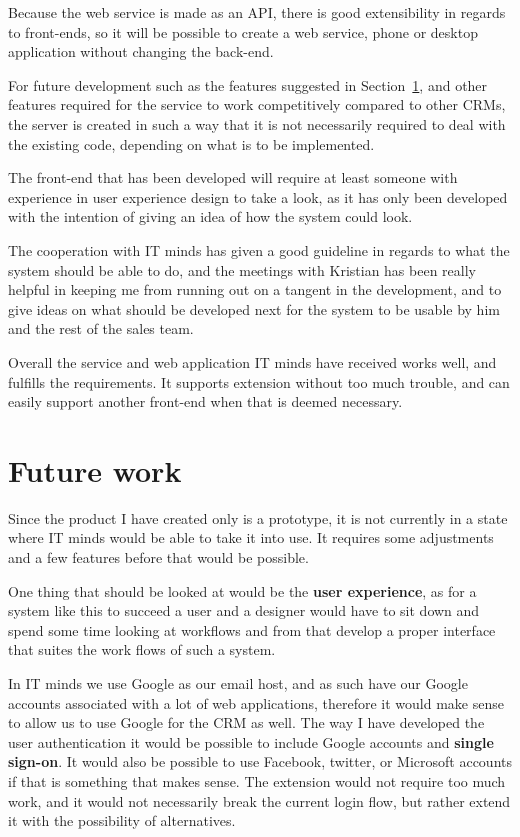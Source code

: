 Because the web service is made as an API, there is good extensibility in regards
to front-ends, so it will be possible to create a web service, phone or desktop
application without changing the back-end.

For future development such as the features suggested in
Section~\ref{sec:future_work}, and other features required for the service to
work competitively compared to other CRMs, the server is created in such a way
that it is not necessarily required to deal with the existing code, depending on
what is to be implemented.

The front-end that has been developed will require at least someone with
experience in user experience design to take a look, as it has only been
developed with the intention of giving an idea of how the system could look.

The cooperation with IT minds has given a good guideline in regards to what the
system should be able to do, and the meetings with Kristian has been really
helpful in keeping me from running out on a tangent in the development, and to
give ideas on what should be developed next for the system to be usable by him
and the rest of the sales team.

Overall the service and web application IT minds have received works well, and
fulfills the requirements. It supports extension without too much trouble, and
can easily support another front-end when that is deemed necessary.

\section{Future work}
\label{sec:future_work}
Since the product I have created only is a prototype, it is not currently in a
state where IT minds would be able to take it into use. It requires some
adjustments and a few features before that would be possible.

One thing that should be looked at would be the \textbf{user experience}, as for a system
like this to succeed a user and a designer would have to sit down and spend
some time looking at workflows and from that develop a proper interface that
suites the work flows of such a system.

In IT minds we use Google as our email host, and as such have our Google
accounts associated with a lot of web applications, therefore it would make sense to
allow us to use Google for the CRM as well. The way I have developed the user
authentication it would be possible to include Google accounts and
\textbf{single sign-on}. It would also be possible to use Facebook, twitter, or
Microsoft accounts if that is something that makes sense. The extension would
not require too much work, and it would not necessarily break the current login
flow, but rather extend it with the possibility of alternatives. 


